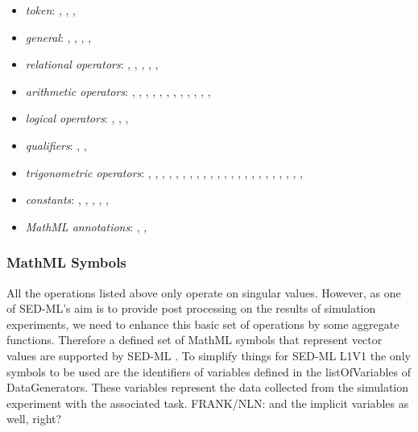 \begin{itemize}\setlength{\parskip}{-0.1ex}

\item \emph{token}: , , ,
  
\item \emph{general}: , ,
  , ,  

\item \emph{relational operators}: , ,
  , , , 

\item \emph{arithmetic operators}: , ,
  , , , ,
  , , , ,
  , , 

\item \emph{logical operators}: , ,
  , 

\item \emph{qualifiers}: , ,

\item \emph{trigonometric operators}: , ,
  , , , ,
  , , , ,
  , , , ,
  , , , ,
  , , ,
  , , 

\item \emph{constants}: , ,
  , , ,

\item \emph{MathML annotations}: ,
  , 
\end{itemize}

\subsubsection{MathML Symbols}
All the operations listed above only operate on singular values. However, as one of SED-ML's aim is to provide post processing on the results of simulation experiments, we need to enhance this basic set of operations by some aggregate functions. 
Therefore a defined set of MathML symbols that represent vector values are supported by SED-ML \LoneVone. 
To simplify things for SED-ML L1V1 the only symbols to be used are the identifiers of variables defined in the listOfVariables of DataGenerators. These variables represent the data collected from the simulation experiment with the associated task. 
\alert{FRANK/NLN: and the implicit variables as well, right?}

